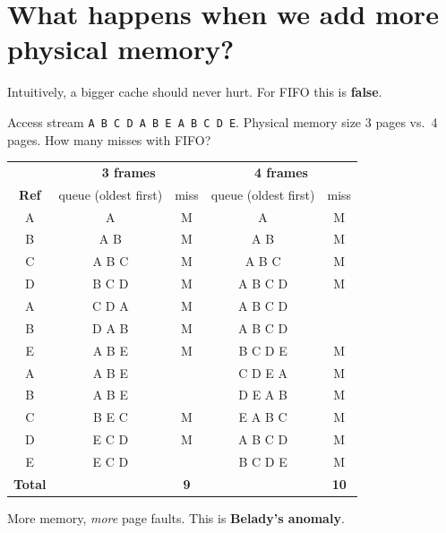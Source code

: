 \documentclass[11pt,a4paper]{article}
\begin{document}
\section{What happens when we add more physical memory?}

Intuitively, a bigger cache should never hurt. For FIFO this is
\textbf{false}.

\begin{quizbox}
Access stream \texttt{A B C D A B E A B C D E}. Physical memory size 3
pages vs.\ 4 pages. How many misses with FIFO?
\end{quizbox}

\begin{solbox}
\begin{center}
\renewcommand{\arraystretch}{1.05}
\setlength{\tabcolsep}{4pt}
\begin{tabular}{@{}c|cc|cc@{}}
  \toprule
  & \multicolumn{2}{c|}{\textbf{3 frames}} & \multicolumn{2}{c}{\textbf{4 frames}} \\
  \textbf{Ref} & queue (oldest first) & miss & queue (oldest first) & miss \\
  \midrule
  A & A       & M & A       & M \\
  B & A B     & M & A B     & M \\
  C & A B C   & M & A B C   & M \\
  D & B C D   & M & A B C D & M \\
  A & C D A   & M & A B C D &   \\
  B & D A B   & M & A B C D &   \\
  E & A B E   & M & B C D E & M \\
  A & A B E   &   & C D E A & M \\
  B & A B E   &   & D E A B & M \\
  C & B E C   & M & E A B C & M \\
  D & E C D   & M & A B C D & M \\
  E & E C D   &   & B C D E & M \\
  \midrule
  \multicolumn{1}{c|}{\textbf{Total}} & & \textbf{9} & & \textbf{10} \\
  \bottomrule
\end{tabular}
\end{center}
More memory, \emph{more} page faults. This is \textbf{Belady's anomaly}.
\end{solbox}
\end{document}
